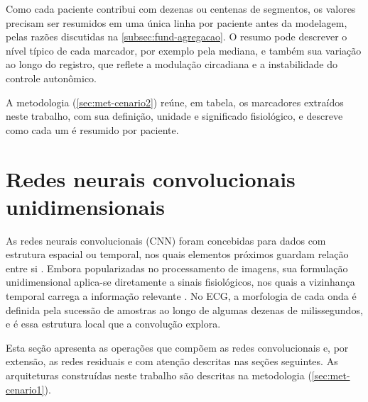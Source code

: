 Como cada paciente contribui com dezenas ou centenas de segmentos, os
valores precisam ser resumidos em uma única linha por paciente antes da
modelagem, pelas razões discutidas na \autoref{subsec:fund-agregacao}. O
resumo pode descrever o nível típico de cada marcador, por exemplo pela
mediana, e também sua variação ao longo do registro, que reflete a
modulação circadiana e a instabilidade do controle autonômico.

A metodologia (\autoref{sec:met-cenario2}) reúne, em tabela, os marcadores
extraídos neste trabalho, com sua definição, unidade e significado
fisiológico, e descreve como cada um é resumido por paciente.





%
%
%

\section{Redes neurais convolucionais unidimensionais}
\label{sec:fund-cnn}

As redes neurais convolucionais (CNN) foram concebidas para dados com estrutura
espacial ou temporal, nos quais elementos próximos guardam relação entre si
\cite{lecun1998gradient}. Embora popularizadas no processamento de imagens,
sua formulação unidimensional aplica-se diretamente a sinais fisiológicos,
nos quais a vizinhança temporal carrega a informação relevante
\cite{kiranyaz2021onedimensional}. No \gls{ECG}, a morfologia de cada onda
é definida pela sucessão de amostras ao longo de algumas dezenas de
milissegundos, e é essa estrutura local que a convolução explora.

Esta seção apresenta as operações que compõem as redes convolucionais e,
por extensão, as redes residuais e com atenção descritas nas seções
seguintes. As arquiteturas construídas neste trabalho são descritas na
metodologia (\autoref{sec:met-cenario1}).

